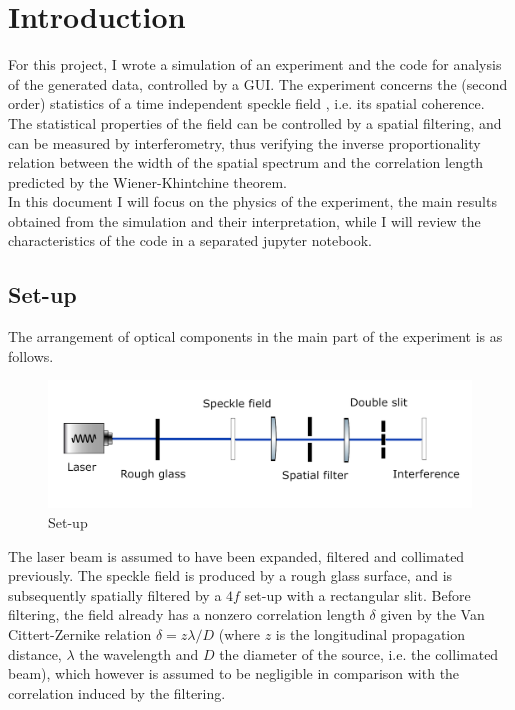 \section{Introduction}

For this project, I wrote a simulation of an experiment and the code for analysis of the generated data, controlled by a GUI. The experiment concerns the (second order) 
statistics of a time independent speckle field , i.e. its spatial coherence. The statistical properties of the field can be controlled by a spatial filtering, 
and can be measured by interferometry, thus verifying the inverse proportionality relation between the width of the spatial spectrum and the correlation 
length predicted by the Wiener-Khintchine theorem. \\

In this document I will focus on the physics of the experiment, the main results obtained from the simulation and their interpretation, while I will review the 
characteristics of the code in a separated jupyter notebook.

\subsection{Set-up}

The arrangement of optical components in the main part of the experiment is as follows.

\begin{figure}[!ht]
    \centering
    \includegraphics[width = .9\textwidth]{Img/setup.png}
    \caption{Set-up}
\end{figure}

The laser beam is assumed to have been expanded, filtered and collimated previously. The speckle field is produced by a rough glass surface, and is subsequently 
spatially filtered by a $4f$ set-up with a rectangular slit. Before filtering, the field already has a nonzero correlation length $\delta$ given by the Van Cittert-Zernike 
relation $\delta = z\lambda / D$ (where $z$ is the longitudinal propagation distance, $\lambda$ the wavelength and $D$ the diameter of the source, i.e. the collimated 
beam), which however is assumed to be negligible in comparison with the correlation induced by the filtering. \\

